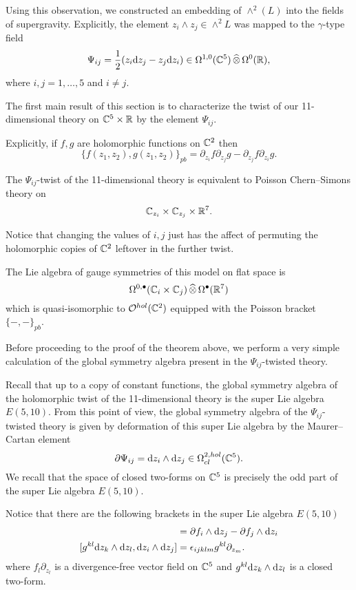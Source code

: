 \documentclass[11pt]{amsart}
\begin{document}
Using this observation, we constructed an embedding of $\wedge^2(L)$ into the fields of supergravity. 
Explicitly, the element $z_i \wedge z_j \in \wedge^2 L$ was mapped to the $\gamma$-type field
\[
\Psi_{ij} = \frac12 (z_i {\rm d} z_j - z_j {\rm d} z_i) \in \Omega^{1,0}(\mathbb C^5) \, \widehat{\otimes} \, \Omega^0(\mathbb R) ,
\]
where $i,j=1,\ldots, 5$ and $i \ne j$.  

\parsec[-] 

The first main result of this section is to characterize the twist of our 11-dimensional theory on $\mathbb C^5 \times \mathbb R$ by the element $\Psi_{ij}$. 

Explicitly, if $f,g$ are holomorphic functions on $\mathbb C^2$ then
\[
\{f(z_1,z_2) , g(z_1,z_2)\}_{pb} = \partial_{z_i} f \partial_{z_j} g - \partial_{z_j} f \partial_{z_i} g .
\]

\begin{thm}
The $\Psi_{ij}$-twist of the 11-dimensional theory is equivalent to Poisson Chern--Simons theory on 
\[
\mathbb C_{z_i} \times \mathbb C_{z_j} \times \mathbb R^7 .
\]
\end{thm}

Notice that changing the values of $i,j$ just has the affect of permuting the holomorphic copies of $\mathbb C^2$ leftover in the further twist. 

The Lie algebra of gauge symmetries of this model on flat space is 
\[
\Omega^{0,\bullet} (\mathbb C_i \times \mathbb C_j) \, \widehat{\otimes} \, \Omega^\bullet(\mathbb R^7) 
\]
which is quasi-isomorphic to $\mathcal O^{hol}(\mathbb C^2)$ equipped with the Poisson bracket $\{-,-\}_{pb}$. 

Before proceeding to the proof of the theorem above, we perform a very simple calculation of the global symmetry algebra present in the $\Psi_{ij}$-twisted theory. 

Recall that up to a copy of constant functions, the global symmetry algebra of the holomorphic twist of the 11-dimensional theory is the super Lie algebra $E(5,10)$.
From this point of view, the global symmetry algebra of the $\Psi_{ij}$-twisted theory is given by deformation of this super Lie algebra by the Maurer--Cartan element 
\[
\partial \Psi_{ij} = {\rm d} z_i \wedge {\rm d} z_j \in \Omega^{2,hol}_{cl}(\mathbb C^5) .
\]
We recall that the space of closed two-forms on $\mathbb C^5$ is precisely the odd part of the super Lie algebra $E(5,10)$. 

Notice that there are the following brackets in the super Lie algebra $E(5,10)$ 
\begin{align*}
[f_l \partial_{z_l} , \d z_i \wedge \d z_j] & = \del f_i \wedge \d z_j - \del f_j \wedge \d z_i \\
[g^{kl} \d z_k \wedge \d z_l , \d z_i \wedge \d z_j ] & = \ep_{ijklm} g^{kl} \partial_{z_m} .
\end{align*}
where $f_l \partial_{z_l}$ is a divergence-free vector field on $\mathbb C^5$ and $g^{kl} {\rm d} z_k \wedge {\rm d} z_l$ is a closed two-form. 
\end{document}
